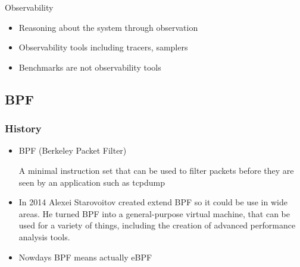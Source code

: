 \documentclass{beamer}
\begin{document}
\begin{frame}
  \begin{block}{Observability}
		\begin{Large}
			\begin{itemize}
				\item<+-> Reasoning about the system through observation
				\item<+-> Observability tools including tracers, samplers
				\item<+-> Benchmarks are not observability tools
			\end{itemize}
		\end{Large}
  \end{block} 
\end{frame}


\subsection{BPF} %

\begin{frame}
\frametitle{History}
\begin{itemize}
\item<1->
BPF (Berkeley Packet Filter)

A minimal instruction set that can be used to filter packets before they are seen by an application such
as tcpdump
\item<2->
In 2014 Alexei Starovoitov created extend BPF so it could be use in wide areas.
He turned BPF into a general-purpose virtual machine, that can be used for a variety of things,
including the creation of advanced performance analysis tools.
\item<3-> Nowdays BPF means actually eBPF
\end{itemize}
\end{frame}
\end{document}
